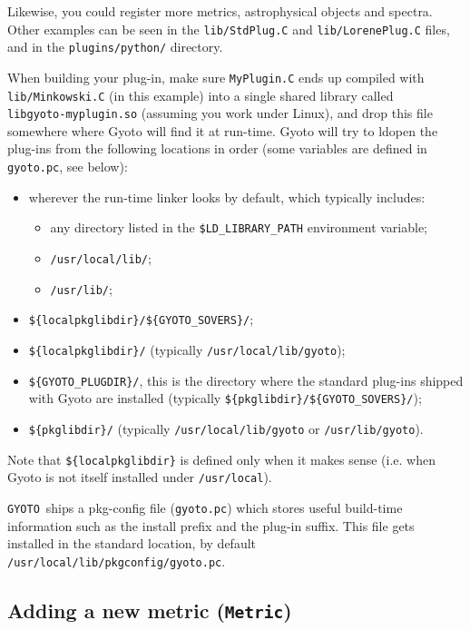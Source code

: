 \documentclass[a4paper,12pt]{article}
\newcommand{\GYOTO}{\texttt{GYOTO}}
\newcommand{\Metric}{\texttt{Metric}}
\begin{document}
Likewise, you could register more metrics, astrophysical objects and
spectra. Other examples can be seen in the \texttt{lib/StdPlug.C} and
\texttt{lib/LorenePlug.C} files, and in the \texttt{plugins/python/}
directory.

When building your plug-in, make sure \texttt{MyPlugin.C} ends up
compiled with\\ \texttt{lib/Minkowski.C} (in this example) into a
single shared library called\\ \texttt{libgyoto-myplugin.so} (assuming
you work under Linux), and drop this file somewhere where Gyoto
will find it at run-time. Gyoto will try to ldopen the plug-ins from
the following locations in order (some variables are defined in
\texttt{gyoto.pc}, see below):
\begin{itemize}
\item wherever the run-time linker looks by default, which typically
  includes:
  \begin{itemize}
  \item any directory listed in the \texttt{\$LD\_LIBRARY\_PATH}
    environment variable;
  \item \texttt{/usr/local/lib/};
  \item \texttt{/usr/lib/};
  \end{itemize}
\item \texttt{\$\{localpkglibdir\}/\$\{GYOTO\_SOVERS\}/};
\item \texttt{\$\{localpkglibdir\}/} (typically \texttt{/usr/local/lib/gyoto});
\item \texttt{\$\{GYOTO\_PLUGDIR\}/}, this is the directory where the
  standard plug-ins shipped with Gyoto are installed (typically
  \texttt{\$\{pkglibdir\}/\$\{GYOTO\_SOVERS\}/});
\item \texttt{\$\{pkglibdir\}/} (typically
  \texttt{/usr/local/lib/gyoto} or \texttt{/usr/lib/gyoto}).
\end{itemize}
Note that \texttt{\$\{localpkglibdir\}} is defined only when it makes
sense (i.e. when Gyoto is not itself installed under \texttt{/usr/local}).

\GYOTO\ ships a pkg-config file (\texttt{gyoto.pc}) which stores
useful build-time information such as the install prefix and the
plug-in suffix. This file gets installed in the standard location, by
default \texttt{/usr/local/lib/pkgconfig/gyoto.pc}.

\subsection{Adding a new metric (\Metric)}
\end{document}
